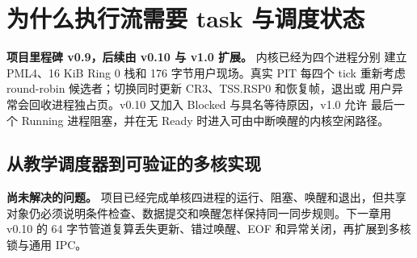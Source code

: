\chapter{为什么执行流需要 task 与调度状态}

\begin{statebox}
\textbf{项目里程碑 v0.9，后续由 v0.10 与 v1.0 扩展。} 内核已经为四个进程分别
建立 PML4、16 KiB Ring 0 栈和 176 字节用户现场。真实 PIT 每四个 tick
重新考虑 round-robin 候选者；切换同时更新 CR3、TSS.RSP0 和恢复帧，退出或
用户异常会回收进程独占页。v0.10 又加入 Blocked 与具名等待原因，v1.0 允许
最后一个 Running 进程阻塞，并在无 Ready 时进入可由中断唤醒的内核空闲路径。
\end{statebox}



\section{从教学调度器到可验证的多核实现}

\begin{problemframe}
\textbf{尚未解决的问题。} 项目已经完成单核四进程的运行、阻塞、唤醒和退出，但共享
对象仍必须说明条件检查、数据提交和唤醒怎样保持同一同步规则。下一章用 v0.10 的
64 字节管道复算丢失更新、错过唤醒、EOF 和异常关闭，再扩展到多核锁与通用 IPC。
\end{problemframe}
